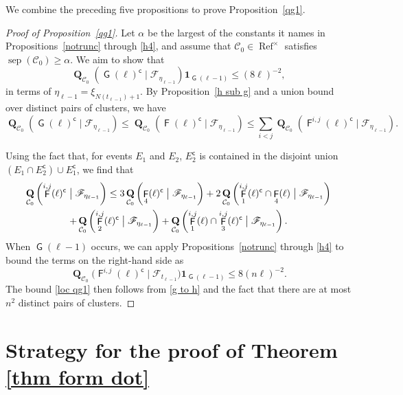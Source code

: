 \documentclass[11pt,reqno]{amsart}
\theoremstyle{definition}
\numberwithin{equation}{section}
\newcommand{\1}{\mathbf{1}}
\DeclareMathOperator{\PPprod}{\mathbf{Q}}
\DeclareMathOperator{\sep}{sep}
\DeclareMathOperator{\Refcon}{\mathrm{Ref}}
\newcommand{\cc}{\mathsf{c}}
\DeclareMathOperator{\GG}{\mathsf{G}}
\DeclareMathOperator{\FF}{\mathsf{F}}
\newcommand{\CC}{\mathcal{C}}
\begin{document}
We combine the preceding five propositions to prove Proposition~\ref{qg1}.

\begin{proof}[Proof of Proposition~\ref{qg1}]
Let $\alpha$ be the largest of the constants it names in Propositions~\ref{notrunc} through \ref{h4}, and assume that $\CC_0 \in \Refcon^\times$ satisfies $\sep (\CC_0) \geq \alpha$. We aim to show that 
\begin{equation}\label{loc qg1}
\PPprod_{\CC_0} \left( \GG (\ell)^\cc \mid \mathscr{F}_{\eta_{\ell-1}} \right) \1_{\GG (\ell-1)} \leq (8 \ell)^{-2},
\end{equation}
in terms of $\eta_{\ell-1} = \xi_{N(t_{\ell-1})+1}$. 
By Proposition~\ref{h sub g} and a union bound over distinct pairs of clusters, we have
\begin{equation}\label{g to h}
\PPprod_{\CC_0} \left( \GG (\ell)^\cc \mid \mathscr{F}_{\eta_{\ell-1}} \right) \leq \PPprod_{\CC_0} \left( \FF (\ell)^\cc \mid \mathscr{F}_{\eta_{\ell-1}} \right) \leq \sum_{i < j} \PPprod_{\CC_0} \left( \FF^{i,j} (\ell)^\cc \mid \mathscr{F}_{\eta_{\ell-1}} \right).
\end{equation}


Using the fact that, for events $E_1$ and $E_2$, $E_2^\cc$ is contained in the disjoint union $( E_1 \cap E_2^\cc ) \cup E_1^\cc$, we find that
\begin{multline*}
\PPprod_{\CC_0} \left( \FF^{i,j} (\ell)^\cc \bigm\vert \mathscr{F}_{\eta_{\ell-1}} \right) \leq 3 \PPprod_{\CC_0} \left( \FF_4 (\ell)^\cc \bigm\vert \mathscr{F}_{\eta_{\ell-1}} \right) + 2 \PPprod_{\CC_0} \left( \FF_1^{i,j} (\ell)^\cc \cap \FF_4 (\ell) \bigm\vert \mathscr{F}_{\eta_{\ell-1}} \right)\\  
+ \PPprod_{\CC_0} \left( \FF_2^{i,j} (\ell)^\cc \bigm\vert \mathscr{F}_{\eta_{\ell-1}} \right) + \PPprod_{\CC_0} \left( \FF_1^{i,j} (\ell) \cap \FF_3^{i,j} (\ell)^\cc \bigm\vert \mathscr{F}_{\eta_{\ell-1}} \right).
\end{multline*}
When $\GG(\ell-1)$ occurs, we can apply Propositions~\ref{notrunc} through \ref{h4} to bound the terms on the right-hand side as 
\[
\PPprod_{\CC_0} \big( \FF^{i,j} (\ell)^\cc \mid \mathscr{F}_{t_{\ell-1}} \big) \1_{\GG(\ell-1)} \leq 8(n\ell)^{-2}.
\]
The bound \eqref{loc qg1} then follows from \eqref{g to h} and the fact that there are at most $n^2$ distinct pairs of clusters. 
\end{proof}


\section{Strategy for the proof of Theorem \ref{thm form dot}}\label{sec strat 11}
\end{document}

